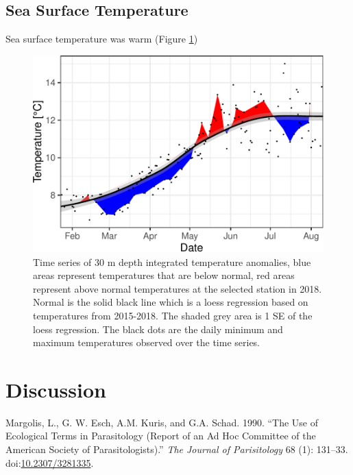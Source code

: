 \documentclass[fleqn,10pt]{wlpeerj} %
\begin{document}
\subsection*{Sea Surface Temperature}\label{sea-surface-temperature}

Sea surface temperature was warm (Figure \ref{fig:sst})

\begin{figure}
\includegraphics[width=0.8\linewidth]{peer_j_migration_dynamics_files/figure-latex/sst-1} \caption{Time series of 30 m depth integrated temperature anomalies, blue areas represent temperatures that are below normal, red areas represent above normal temperatures at the selected station in 2018. Normal is the solid black line which is a loess regression based on temperatures from 2015-2018. The shaded grey area is 1 SE of the loess regression. The black dots are the daily minimum and maximum temperatures observed over the time series.}\label{fig:sst}
\end{figure}

\section*{Discussion}\label{discussion}

\hypertarget{refs}{}
\hypertarget{ref-Margolis1990}{}
Margolis, L., G. W. Esch, A.M. Kuris, and G.A. Schad. 1990. ``The Use of
Ecological Terms in Parasitology (Report of an Ad Hoc Committee of the
American Society of Parasitologists).'' \emph{The Journal of
Parisitology} 68 (1): 131--33.
doi:\href{https://doi.org/10.2307/3281335}{10.2307/3281335}.
\end{document}
